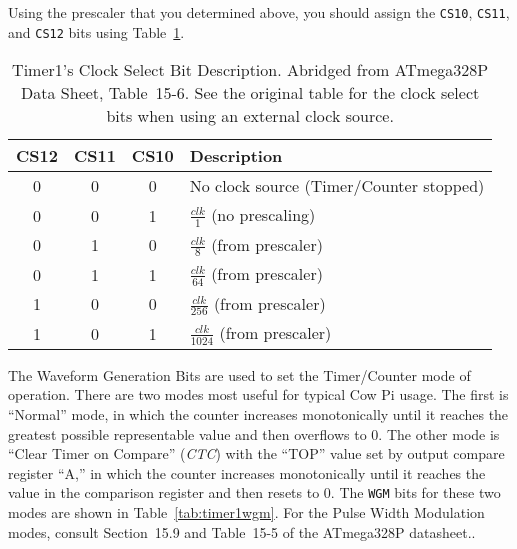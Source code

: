 Using the prescaler that you determined above, you should assign the \texttt{CS10}, \texttt{CS11}, and \texttt{CS12} bits using Table~\ref{tab:timer1clockselect}.

\begin{table}[h]
    \centering \small
    \begin{tabular}{|c|c|c|l|} \hline
    \textbf{CS12}   & \textbf{CS11} & \textbf{CS10} & \textbf{Description}                          \\ \hline\hline
        0               & 0             & 0             & No clock source (Timer/Counter stopped)   \\ \hline
        0               & 0             & 1             & $\frac{clk}{1}$ (no prescaling)           \\ \hline
        0               & 1             & 0             & $\frac{clk}{8}$ (from prescaler)          \\ \hline
        0               & 1             & 1             & $\frac{clk}{64}$ (from prescaler)         \\ \hline
        1               & 0             & 0             & $\frac{clk}{256}$ (from prescaler)        \\ \hline
        1               & 0             & 1             & $\frac{clk}{1024}$ (from prescaler)       \\ \hline
    \end{tabular}
    \caption{Timer1's Clock Select Bit Description. \tiny Abridged from ATmega328P Data Sheet, Table~15\mbox{-}6.\cite{ATmega328P} See the original table for the clock select bits when using an external clock source. \label{tab:timer1clockselect}}
\end{table}

The Waveform Generation Bits are used to set the Timer/Counter mode of operation.
There are two modes most useful for typical Cow Pi usage.
The first is ``Normal'' mode, in which the counter increases monotonically until it reaches the greatest possible representable value and then overflows to 0.
The other mode is ``Clear Timer on Compare'' (\textit{CTC}) with the ``TOP'' value set by output compare register ``A,'' in which the counter increases monotonically until it reaches the value in the comparison register and then resets to 0.
The \texttt{WGM} bits for these two modes are shown in Table~\ref{tab:timer1wgm}.
For the Pulse Width Modulation modes, consult Section~15.9 and Table~15\mbox{-}5 of the ATmega328P datasheet.\cite{ATmega328P}.

